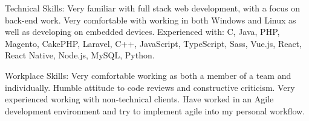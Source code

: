 
\inlineheadsection 
{Technical Skills:}
{Very familiar with full stack web development, with a focus on back-end work. Very comfortable with working in both Windows and Linux as well as developing on embedded devices. Experienced with: C, Java, PHP, Magento, CakePHP, Laravel, C++, JavaScript, TypeScript, Sass, Vue.js, React, React Native, Node.js, MySQL, Python.}

\vspace{0.5em}
\inlineheadsection 
{Workplace Skills:}
{Very comfortable working as both a member of a team and individually. Humble attitude to code reviews and constructive criticism. Very experienced working with non-technical clients. Have worked in an Agile development environment and try to implement agile into my personal workflow.}

\spacedhrule{1.6em}{-0.4em}

